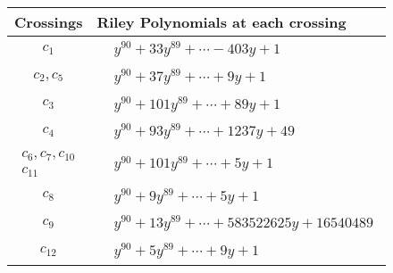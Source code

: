 \documentclass[1p]{elsarticle_modified}
\theoremstyle{definition}
\begin{document}
\begin{tabular}{m{50pt}|m{274pt}}
Crossings & \hspace{64pt}Riley Polynomials at each crossing \\
\hline $$\begin{aligned}c_{1}\end{aligned}$$&$\begin{aligned}
&y^{90}+33 y^{89}+\cdots-403 y+1
\end{aligned}$\\
\hline $$\begin{aligned}c_{2},c_{5}\end{aligned}$$&$\begin{aligned}
&y^{90}+37 y^{89}+\cdots+9 y+1
\end{aligned}$\\
\hline $$\begin{aligned}c_{3}\end{aligned}$$&$\begin{aligned}
&y^{90}+101 y^{89}+\cdots+89 y+1
\end{aligned}$\\
\hline $$\begin{aligned}c_{4}\end{aligned}$$&$\begin{aligned}
&y^{90}+93 y^{89}+\cdots+1237 y+49
\end{aligned}$\\
\hline $$\begin{aligned}c_{6},c_{7},c_{10}\\c_{11}\end{aligned}$$&$\begin{aligned}
&y^{90}+101 y^{89}+\cdots+5 y+1
\end{aligned}$\\
\hline $$\begin{aligned}c_{8}\end{aligned}$$&$\begin{aligned}
&y^{90}+9 y^{89}+\cdots+5 y+1
\end{aligned}$\\
\hline $$\begin{aligned}c_{9}\end{aligned}$$&$\begin{aligned}
&y^{90}+13 y^{89}+\cdots+583522625 y+16540489
\end{aligned}$\\
\hline $$\begin{aligned}c_{12}\end{aligned}$$&$\begin{aligned}
&y^{90}+5 y^{89}+\cdots+9 y+1
\end{aligned}$\\
\hline
\end{tabular}\\~\\
\end{document}
